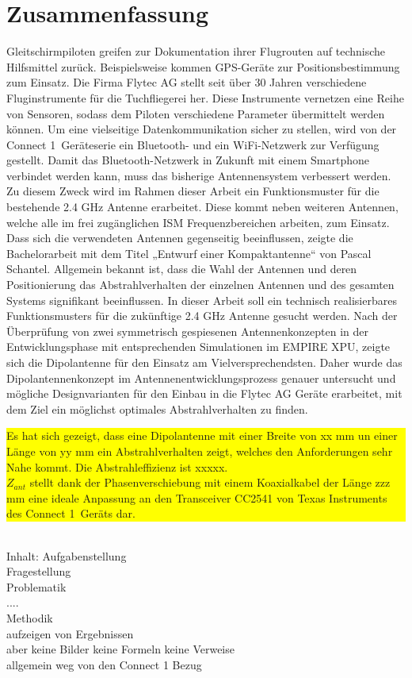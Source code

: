 \newpage
\section*{Zusammenfassung}

Gleitschirmpiloten greifen zur Dokumentation ihrer Flugrouten auf technische Hilfsmittel zurück. Beispielsweise kommen GPS-Geräte zur Positionsbestimmung zum Einsatz. Die Firma Flytec AG stellt seit über 30 Jahren verschiedene Fluginstrumente für die Tuchfliegerei her. Diese Instrumente vernetzen eine Reihe von Sensoren, sodass dem Piloten verschiedene Parameter übermittelt werden können. Um eine vielseitige Datenkommunikation sicher zu stellen, wird von der \glqq Connect 1\grqq \  Geräteserie ein Bluetooth- und ein WiFi-Netzwerk zur Verfügung gestellt. Damit das Bluetooth-Netzwerk in Zukunft mit einem Smartphone verbindet werden kann, muss das bisherige Antennensystem verbessert werden. Zu diesem Zweck wird im Rahmen dieser Arbeit ein Funktionsmuster für die bestehende 2.4 GHz Antenne erarbeitet. Diese kommt  neben weiteren Antennen, welche alle im frei zugänglichen ISM Frequenzbereichen arbeiten, zum Einsatz. Dass sich die verwendeten Antennen gegenseitig beeinflussen, zeigte die Bachelorarbeit mit dem Titel „Entwurf einer Kompaktantenne“ von Pascal Schantel.
Allgemein bekannt ist, dass die Wahl der Antennen und deren Positionierung das Abstrahlverhalten der einzelnen Antennen und des gesamten Systems signifikant beeinflussen. In dieser Arbeit soll ein technisch realisierbares Funktionsmusters für die zukünftige 2.4 GHz Antenne gesucht werden.  Nach der Überprüfung von zwei symmetrisch gespiesenen Antennenkonzepten in der Entwicklungsphase mit entsprechenden Simulationen im EMPIRE XPU, zeigte sich die Dipolantenne für den Einsatz am Vielversprechendsten. Daher wurde das Dipolantennenkonzept im Antennenentwicklungsprozess genauer untersucht und mögliche Designvarianten für den Einbau in die Flytec AG Geräte erarbeitet, mit dem Ziel ein möglichst optimales Abstrahlverhalten zu finden.\\
  \colorbox{yellow}{\parbox[t]{\textwidth}{Es hat sich gezeigt, dass eine Dipolantenne mit einer Breite von xx mm un einer Länge von yy mm 
   ein Abstrahlverhalten zeigt, welches den Anforderungen sehr Nahe kommt. 
   Die Abstrahleffizienz ist xxxxx.\\
   $Z_{ant}$ stellt dank der Phasenverschiebung  mit einem  Koaxialkabel der Länge zzz mm eine ideale Anpassung  an den Transceiver CC2541 von Texas Instruments des \glqq Connect 1\grqq  \ Geräts dar.}}\\


Inhalt:
Aufgabenstellung\\
Fragestellung\\
Problematik\\
....\\
Methodik\\
aufzeigen von Ergebnissen\\

aber keine Bilder keine Formeln keine Verweise\\

allgemein weg von den Connect 1 Bezug
